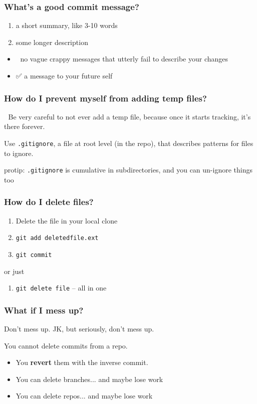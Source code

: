 \documentclass[14pt,aspectratio=1610]{beamer} %
\newcommand{\fframe}[2]{
   \begin{frame}
\frametitle{#1}
#2
\end{frame}
}
\begin{document}
\fframe{What's a good commit message?}
{
	\begin{enumerate}
		\item a short summary, like 3-10 words
		\item some longer description
	\end{enumerate}

\begin{itemize}
		\item 🚫 no vague crappy messages that utterly fail to describe your changes
		\item ✅ a message to your future self
	\end{itemize}
}

\fframe{How do I prevent myself from adding temp files?}
{
	🔴 Be very careful to not ever add a temp file, because once it starts tracking, it's there forever.  

\vspace{\baselineskip}
	Use {\tt .gitignore}, a file at root level (in the repo), that describes patterns for files to ignore.

\vfill
	protip: {\tt .gitignore} is cumulative in subdirectories, and you can un-ignore things too
}


\fframe{How do I delete files?}
{
	\begin{enumerate}
		\item Delete the file in your local clone
		\item {\tt git add deletedfile.ext}
		\item {\tt git commit}
	\end{enumerate}

	or just

	\begin{enumerate}
		\item {\tt git delete file} -- all in one
	\end{enumerate}
}


\fframe{What if I mess up?}
{
	Don't mess up.   JK, but seriously, don't mess up.

\vspace{\baselineskip}

	You cannot delete commits from a repo.  
	\begin{itemize}
		\item You {\bf revert} them with the inverse commit.   
		\item You can delete branches... and maybe lose work
		\item You can delete repos... and maybe lose work
	\end{itemize}
}
\end{document}
